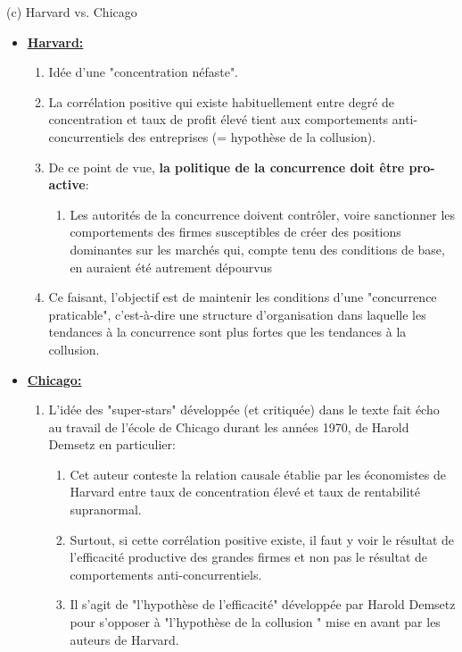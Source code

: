 \begin{frame}[allowframebreaks]{(c) Harvard vs. Chicago}
\begin{itemize}
\item \textbf{\underline{Harvard:}}
\begin{enumerate}[-]
    \item Idée d’une "concentration néfaste".
    \item La corrélation positive qui existe habituellement entre degré de concentration et taux de profit 
    élevé tient aux comportements anti-concurrentiels des entreprises (= hypothèse de la collusion). 
    \item De ce point de vue, \textbf{la politique de la concurrence doit être pro-active}: 
    \begin{enumerate}[$\star$]
    \item Les autorités de la concurrence doivent contrôler, voire sanctionner les comportements des firmes susceptibles 
    de créer des positions dominantes sur les marchés qui, compte tenu des conditions de base, 
    en auraient été autrement dépourvus
    \end{enumerate}
    \item Ce faisant, l’objectif est de maintenir les conditions d’une "concurrence praticable", 
    c’est-à-dire une structure d’organisation dans laquelle les tendances à la concurrence 
    sont plus fortes que les tendances à la collusion.
\end{enumerate}
\framebreak
\item \textbf{\underline{Chicago:}}
\begin{enumerate}[-]
\item L'idée des "super-stars" développée (et critiquée) dans le texte fait écho 
au travail de l'école 
de Chicago durant les années 1970, de Harold Demsetz en particulier:
\begin{enumerate}[$\star$]
    \item Cet auteur conteste la relation causale établie par les économistes de Harvard entre taux de concentration élevé et taux de rentabilité supranormal.
    \item Surtout, si cette corrélation positive existe, il faut y voir le résultat de l’efficacité productive des grandes firmes et non pas le résultat de comportements anti-concurrentiels.
    \item Il s’agit de "l’hypothèse de l’efficacité" développée par Harold Demsetz pour s’opposer à "l’hypothèse de la collusion " 
    mise en avant par les auteurs de Harvard.

\end{enumerate}
\end{enumerate}
\end{itemize}
\end{frame}
